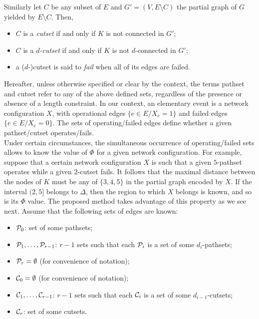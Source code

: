 \documentclass[a4paper]{article}
\begin{document}
Similarly let $C$ be any subset of $E$ and $G'=(V,E\setminus C)$ the partial graph of $G$ yielded by $E\setminus C$. Then,

\begin{itemize}
\item $C$ is a \emph{cutset} if and only if $K$ is not connected in $G'$;
\item $C$ is a \emph{\mbox{$d$-cutset}} if and only if $K$ is not \mbox{$d$-connected} in $G'$;
\item a \mbox{($d$-)cutset} is said to \emph{fail} when all of its edges are failed.
\end{itemize}

Hereafter, unless otherwise specified or clear by the context, the terms pathset and cutset refer to any of the above defined sets, regardless of the presence or absence of a length constraint. In our context, an elementary event is a network configuration $X$, with operational edges $\{e\in E/ X_e=1\}$ and failed edges $\{e\in E/ X_e=0\}$. The sets of operating/failed edges define whether a given pathset/cutset operates/fails. \\
 
Under certain circumstances, the simultaneous occurrence of operating/failed sets allows to know the value of $\Phi$ for a given network configuration. For example, suppose that a certain network configuration $X$ is such that a given \mbox{$5$-pathset} operates while a given \mbox{$2$-cutset} fails. It follows that the maximal distance between the nodes of $K$ must be any of $\{3,4,5\}$ in the partial graph encoded by $X$. If the interval $(2,5]$ belongs to $\Delta$, then the region to which $X$ belongs is known, and so is its $\Phi$ value. The proposed method takes advantage of this property as we see next. Assume that the following sets of edges are known:

\begin{itemize}
\item ${\cal P}_0$: set of some pathsets;
\item ${\cal P}_1,\dots,{\cal P}_{r-1}$: $r-1$ sets such that each ${\cal P}_i$ is a set of some \mbox{$d_i$-pathsets};
\item ${\cal P}_r=\emptyset$ (for convenience of notation);
\item ${\cal C}_0=\emptyset$ (for convenience of notation);
\item ${\cal C}_1,\dots,{\cal C}_{r-1}$: $r-1$ sets such that each ${\cal C}_i$ is a set of some \mbox{$d_{i-1}$-cutsets};
\item ${\cal C}_r$: set of some cutsets.
\end{itemize}
\end{document}
